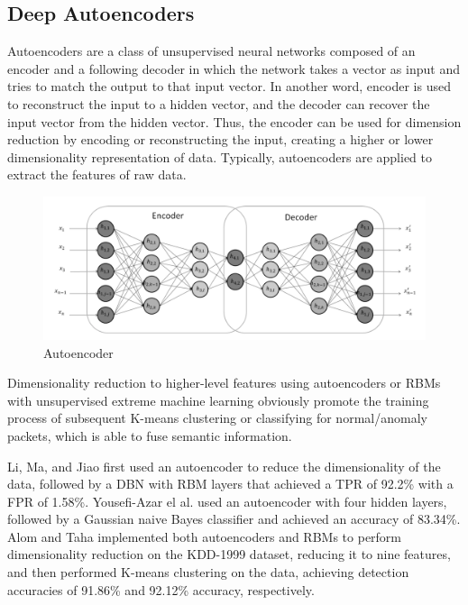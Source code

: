 \documentclass[conference]{IEEEtran}
\begin{document}
\subsection{Deep Autoencoders}
Autoencoders are a class of unsupervised neural networks composed of an encoder and a following decoder in which the network takes a vector as input and tries to match the output to that input vector. In another word, encoder is used to reconstruct the input to a hidden vector, and the decoder can recover the input vector from the hidden vector. Thus, the encoder can be used for dimension reduction by encoding or reconstructing the input, creating a higher or lower dimensionality representation of data. Typically, autoencoders are applied to extract the features of raw data.



\begin{figure}[ht]
\centering
\includegraphics[scale=0.11]{pictures/Auto.PNG}
\caption{Autoencoder}
\label{fig:auto}
\end{figure}

Dimensionality reduction to higher-level features using autoencoders or RBMs with unsupervised extreme machine learning obviously promote the training process of subsequent K-means clustering or classifying for normal/anomaly packets, which is able to fuse semantic information. 

Li, Ma, and Jiao \cite{li2015hybrid} first used an autoencoder to reduce the dimensionality of the data, followed by a DBN with RBM layers that achieved a TPR of 92.2\% with a FPR of 1.58\%. Yousefi-Azar el al. \cite{yousefi2017autoencoder} used an autoencoder with four hidden layers, followed by a Gaussian naive Bayes classifier and achieved an accuracy of 83.34\%. Alom and Taha \cite{alom2017network} implemented both autoencoders and RBMs to perform dimensionality reduction on the KDD-1999 dataset, reducing it to nine features, and then performed K-means clustering on the data, achieving detection accuracies of 91.86\% and 92.12\% accuracy, respectively. 
\end{document}
